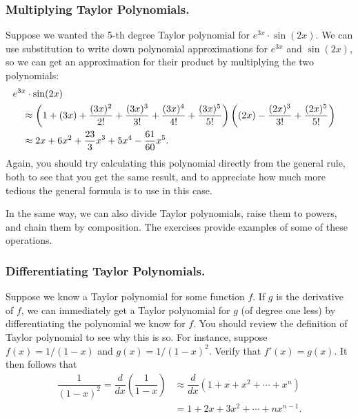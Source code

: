 \subsubsection{Multiplying Taylor Polynomials.}
Suppose we wanted the 5-th
degree Taylor polynomial for $e^{3x}\cdot \sin(2x)$.  We can use
substitution to write down polynomial approximations for $e^{3x}$ and
$\sin(2x)$, so we can get an approximation for their product by
multiplying the two polynomials:
\begin{align*}
\lefteqn{e^{3x} \cdot \sin(2x)}\quad \\
&\approx \left(1 + (3x)+ \dfrac{(3x)^2}{2!} + \dfrac{(3x)^3}{3!} +
      \dfrac{(3x)^4}{4!} + \dfrac{(3x)^5}{5!}\right)
    \left((2x) - \dfrac{(2x)^3}{3!} + \dfrac{(2x)^5}{5!}\right) \\
&\approx  2x + 6x^2 + \dfrac{23}{3}x^3 + 5x^4 - \dfrac{61}{60}x^5.
\end{align*}
Again, you should try calculating this polynomial directly from the
general rule, both to see that you get the same result, and to
appreciate how much more tedious the general formula is to use in this
case.

In the same way, we can also divide Taylor polynomials, raise them to
powers, and chain them by composition. The exercises provide examples
of some of these operations.




\subsubsection{Differentiating Taylor Polynomials.}
Suppose we know a Taylor
polynomial for some function $f$. If $g$ is the derivative of $f$, we
can immediately get a Taylor polynomial for $g$ (of degree one less)
by differentiating the polynomial we know for $f$. You should review
the definition of Taylor polynomial to see why this is so.  For
instance, suppose $f(x) = 1/(1-x)$ and $g(x) =1/(1-x)^2 $.  Verify
that $f'(x) = g(x)$. It then follows that
\begin{align*}
\dfrac{1}{(1-x)^2} 
   = \dfrac{d}{dx} \left(\dfrac{1}{1 - x}\right)
   &\approx \dfrac{d}{dx} (1 + x + x^2 + \cdots + x^n) \\[3pt]
   &= 1 + 2x + 3x^2 + \cdots + nx^{n-1}.
\end{align*} 




